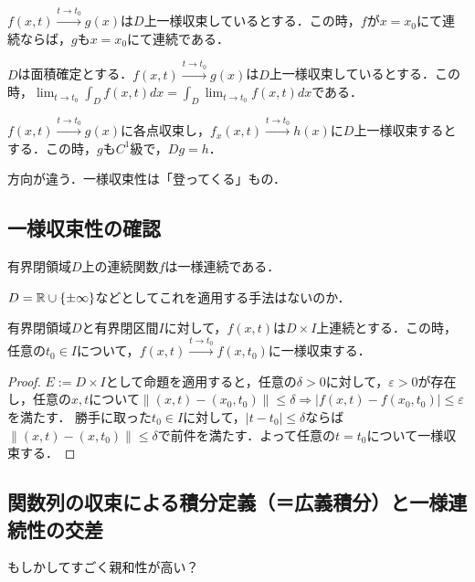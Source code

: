 \documentclass[uplatex, dvipdfmx]{jsreport}
\begin{document}
\begin{proposition}[連続性の持ち上げ]
    $f(x,t)\xrightarrow{t\to t_0}g(x)$は$D$上一様収束しているとする．この時，$f$が$x=x_0$にて連続ならば，$g$も$x=x_0$にて連続である．
\end{proposition}

\begin{proposition}[積分と極限の交換]
    $D$は面積確定とする．$f(x,t)\xrightarrow{t\to t_0}g(x)$は$D$上一様収束しているとする．この時，$\lim_{t\to t_0}\int_Df(x,t)dx=\int_D\lim_{t\to t_0}f(x,t)dx$である．
\end{proposition}

\begin{proposition}[微分と極限の交換]
    $f(x,t)\xrightarrow{t\to t_0}g(x)$に各点収束し，$f_x(x,t)\xrightarrow{t\to t_0}h(x)$に$D$上一様収束するとする．この時，$g$も$C^1$級で，$Dg=h$．
\end{proposition}
\begin{remark}
    方向が違う．一様収束性は「登ってくる」もの．
\end{remark}

\subsection{一様収束性の確認}

\begin{proposition}
    有界閉領域$D$上の連続関数$f$は一様連続である．
\end{proposition}
\begin{remark}
    $D=\mathbb{R}\cup\{\pm\infty\}$などとしてこれを適用する手法はないのか．
\end{remark}

\begin{corollary}[連続性と一様収束]
    有界閉領域$D$と有界閉区間$I$に対して，$f(x,t)$は$D\times I$上連続とする．この時，任意の$t_0\in I$について，$f(x,t)\xrightarrow{t\to t_0}f(x,t_0)$に一様収束する．
\end{corollary}
\begin{proof}
    $E:=D\times I$として命題を適用すると，任意の$\delta>0$に対して，$\varepsilon>0$が存在し，任意の$x,t$について$\| (x,t)-(x_0,t_0) \|\le\delta\Rightarrow |f(x,t)-f(x_0,t_0)|\le\varepsilon$を満たす．
    勝手に取った$t_0\in I$に対して，$|t-t_0|\le\delta$ならば$\|(x,t)-(x,t_0)\|\le\delta$で前件を満たす．よって任意の$t=t_0$について一様収束する．
\end{proof}

\subsection{関数列の収束による積分定義（＝広義積分）と一様連続性の交差}
もしかしてすごく親和性が高い？
\end{document}

